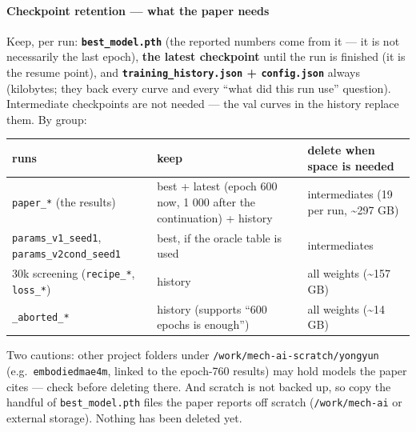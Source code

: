 \documentclass[
  10pt,
]{article}
\newcounter{none} %
\begin{document}
\paragraph{Checkpoint retention --- what the paper
needs}\label{checkpoint-retention-what-the-paper-needs}

Keep, per run: \textbf{\texttt{best\_model.pth}} (the reported numbers
come from it --- it is not necessarily the last epoch), \textbf{the
latest checkpoint} until the run is finished (it is the resume point),
and \textbf{\texttt{training\_history.json} + \texttt{config.json}}
always (kilobytes; they back every curve and every ``what did this run
use'' question). Intermediate checkpoints are not needed --- the val
curves in the history replace them. By group:

{\def\LTcaptype{none} %
\begin{longtable}[]{@{}
  >{\raggedright\arraybackslash}p{}
  >{\raggedright\arraybackslash}p{}
  >{\raggedright\arraybackslash}p{}@{}}
\toprule\noalign{}
\begin{minipage}[b]{\linewidth}\raggedright
runs
\end{minipage} & \begin{minipage}[b]{\linewidth}\raggedright
keep
\end{minipage} & \begin{minipage}[b]{\linewidth}\raggedright
delete when space is needed
\end{minipage} \\
\midrule\noalign{}
\endhead
\bottomrule\noalign{}
\endlastfoot
\texttt{paper\_*} (the results) & best + latest (epoch 600 now, 1 000
after the continuation) + history & intermediates (19 per run,
\textasciitilde297 GB) \\
\texttt{params\_v1\_seed1}, \texttt{params\_v2cond\_seed1} & best, if
the oracle table is used & intermediates \\
30k screening (\texttt{recipe\_*}, \texttt{loss\_*}) & history & all
weights (\textasciitilde157 GB) \\
\texttt{\_aborted\_*} & history (supports ``600 epochs is enough'') &
all weights (\textasciitilde14 GB) \\
\end{longtable}
}

Two cautions: other project folders under
\texttt{/work/mech-ai-scratch/yongyun} (e.g.~\texttt{embodiedmae4m},
linked to the epoch-760 results) may hold models the paper cites ---
check before deleting there. And scratch is not backed up, so copy the
handful of \texttt{best\_model.pth} files the paper reports off scratch
(\texttt{/work/mech-ai} or external storage). Nothing has been deleted
yet.
\end{document}
